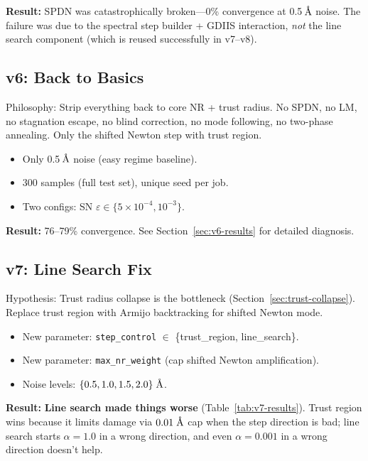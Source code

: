 \documentclass[11pt,a4paper]{article}
\newcommand{\angstrom}{\text{\r{A}}}
\begin{document}
\textbf{Result:} SPDN was catastrophically broken---0\% convergence at 0.5\,$\angstrom$ noise. The failure was due to the spectral step builder + GDIIS interaction, \emph{not} the line search component (which is reused successfully in v7--v8).

\subsection{v6: Back to Basics}

Philosophy: Strip everything back to core NR + trust radius. No SPDN, no LM, no stagnation escape, no blind correction, no mode following, no two-phase annealing. Only the shifted Newton step with trust region.

\begin{itemize}
  \item Only 0.5\,$\angstrom$ noise (easy regime baseline).
  \item 300 samples (full test set), unique seed per job.
  \item Two configs: SN $\varepsilon \in \{5\times10^{-4}, 10^{-3}\}$.
\end{itemize}

\textbf{Result:} 76--79\% convergence. See Section~\ref{sec:v6-results} for detailed diagnosis.

\subsection{v7: Line Search Fix}

Hypothesis: Trust radius collapse is the bottleneck (Section~\ref{sec:trust-collapse}). Replace trust region with Armijo backtracking for shifted Newton mode.

\begin{itemize}
  \item New parameter: \texttt{step\_control} $\in$ \{trust\_region, line\_search\}.
  \item New parameter: \texttt{max\_nr\_weight} (cap shifted Newton amplification).
  \item Noise levels: $\{0.5, 1.0, 1.5, 2.0\}\;\angstrom$.
\end{itemize}

\textbf{Result:} \textbf{Line search made things worse} (Table~\ref{tab:v7-results}). Trust region wins because it limits damage via $0.01\;\angstrom$ cap when the step direction is bad; line search starts $\alpha=1.0$ in a wrong direction, and even $\alpha=0.001$ in a wrong direction doesn't help.
\end{document}

